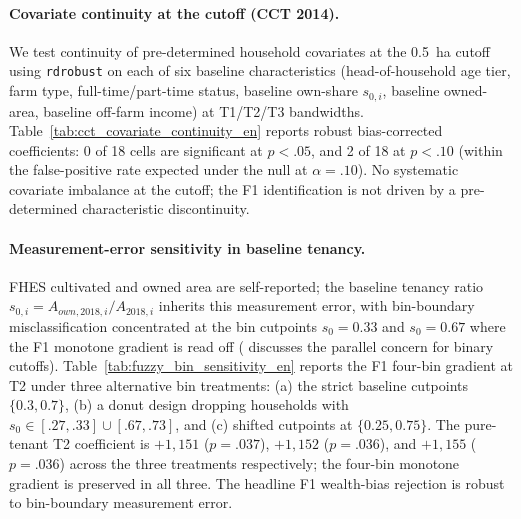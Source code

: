 \documentclass[12pt, a4paper]{article}
\begin{document}
\paragraph{Covariate continuity at the cutoff (CCT 2014).} We test continuity of pre-determined household covariates at the 0.5~ha cutoff using \citet{CalonicoCattaneoTitiunik2014_rdrobust} \texttt{rdrobust} on each of six baseline characteristics (head-of-household age tier, farm type, full-time/part-time status, baseline own-share $s_{0,i}$, baseline owned-area, baseline off-farm income) at T1/T2/T3 bandwidths. Table~\ref{tab:cct_covariate_continuity_en} reports robust bias-corrected coefficients: 0 of 18 cells are significant at $p < .05$, and 2 of 18 at $p < .10$ (within the false-positive rate expected under the null at $\alpha = .10$). No systematic covariate imbalance at the cutoff; the F1 identification is not driven by a pre-determined characteristic discontinuity.



\paragraph{Measurement-error sensitivity in baseline tenancy.}\label{sec:robustness-meas-error} FHES cultivated and owned area are self-reported; the baseline tenancy ratio $s_{0,i} = A_{own,2018,i}/A_{2018,i}$ inherits this measurement error, with bin-boundary misclassification concentrated at the bin cutpoints $s_0 = 0.33$ and $s_0 = 0.67$ where the F1 monotone gradient is read off (\citealp{Roth2022_pretrends} discusses the parallel concern for binary cutoffs). Table~\ref{tab:fuzzy_bin_sensitivity_en} reports the F1 four-bin gradient at T2 under three alternative bin treatments: (a) the strict baseline cutpoints $\{0.3, 0.7\}$, (b) a donut design dropping households with $s_0 \in [.27, .33] \cup [.67, .73]$, and (c) shifted cutpoints at $\{0.25, 0.75\}$. The pure-tenant T2 coefficient is $+1{,}151$ ($p = .037$), $+1{,}152$ ($p = .036$), and $+1{,}155$ ($p = .036$) across the three treatments respectively; the four-bin monotone gradient is preserved in all three. The headline F1 wealth-bias rejection is robust to bin-boundary measurement error.


\end{document}
